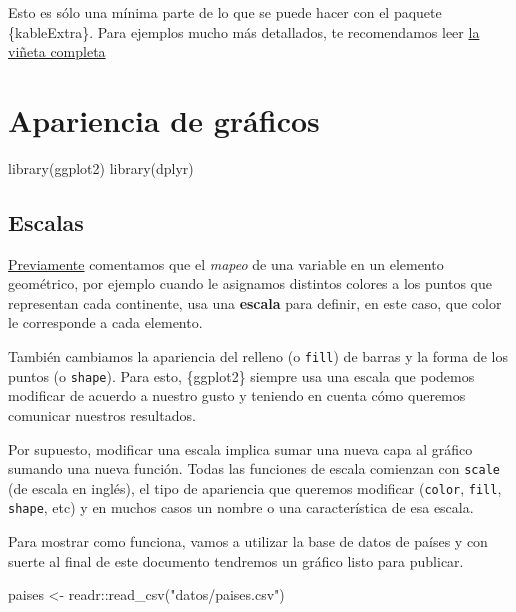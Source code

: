 \documentclass[
  openany]{book}
\newenvironment{Shaded}{\begin{snugshade}}{\end{snugshade}}
\newcommand{\FunctionTok}[1]{\textcolor[rgb]{0.00,0.00,0.00}{#1}}
\newcommand{\NormalTok}[1]{#1}
\newcommand{\OtherTok}[1]{\textcolor[rgb]{0.56,0.35,0.01}{#1}}
\newcommand{\SpecialCharTok}[1]{\textcolor[rgb]{0.00,0.00,0.00}{#1}}
\newcommand{\StringTok}[1]{\textcolor[rgb]{0.31,0.60,0.02}{#1}}
\begin{document}
Esto es sólo una mínima parte de lo que se puede hacer con el paquete \{kableExtra\}.
Para ejemplos mucho más detallados, te recomendamos leer \href{https://cran.r-project.org/web/packages/kableExtra/vignettes/awesome_table_in_html.html}{la viñeta completa}

\hypertarget{apariencia-de-gruxe1ficos}{%
\chapter{Apariencia de gráficos}\label{apariencia-de-gruxe1ficos}}

\begin{Shaded}
\begin{Highlighting}[]
\FunctionTok{library}\NormalTok{(ggplot2)}
\FunctionTok{library}\NormalTok{(dplyr)}
\end{Highlighting}
\end{Shaded}

\hypertarget{escalas}{%
\section{Escalas}\label{escalas}}

\href{06-graficos-I.html}{Previamente} comentamos que el \emph{mapeo} de una variable en un elemento geométrico, por ejemplo cuando le asignamos distintos colores a los puntos que representan cada continente, usa una \textbf{escala} para definir, en este caso, que color le corresponde a cada elemento.

También cambiamos la apariencia del relleno (o \texttt{fill}) de barras y la forma de los puntos (o \texttt{shape}).
Para esto, \{ggplot2\} siempre usa una escala que podemos modificar de acuerdo a nuestro gusto y teniendo en cuenta cómo queremos comunicar nuestros resultados.

Por supuesto, modificar una escala implica sumar una nueva capa al gráfico sumando una nueva función.
Todas las funciones de escala comienzan con \texttt{scale} (de escala en inglés), el tipo de apariencia que queremos modificar (\texttt{color}, \texttt{fill}, \texttt{shape}, etc) y en muchos casos un nombre o una característica de esa escala.

Para mostrar como funciona, vamos a utilizar la base de datos de países y con suerte al final de este documento tendremos un gráfico listo para publicar.

\begin{Shaded}
\begin{Highlighting}[]
\NormalTok{paises }\OtherTok{\textless{}{-}}\NormalTok{ readr}\SpecialCharTok{::}\FunctionTok{read\_csv}\NormalTok{(}\StringTok{"datos/paises.csv"}\NormalTok{)}
\end{Highlighting}
\end{Shaded}
\end{document}
